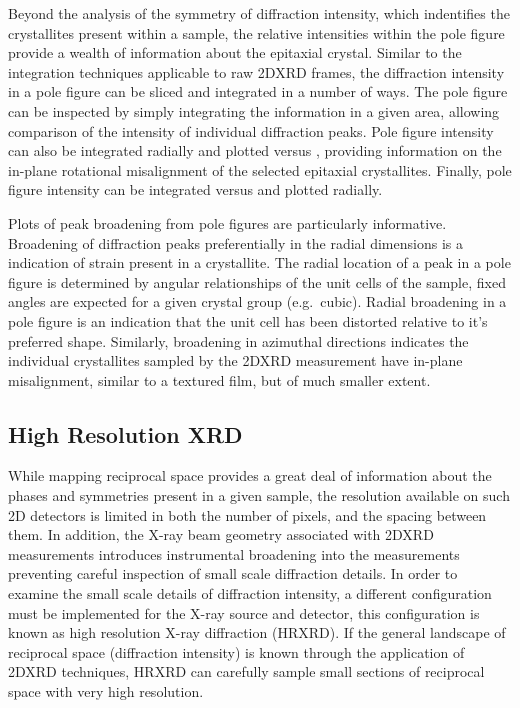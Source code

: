 Beyond the analysis of the symmetry of diffraction intensity, which indentifies the crystallites present within a sample, the relative intensities within the pole figure provide a wealth of information about the epitaxial crystal.
Similar to the integration techniques applicable to raw 2DXRD frames, the diffraction intensity in a pole figure can be sliced and integrated in a number of ways.
The pole figure can be inspected by simply integrating the information in a given area, allowing comparison of the intensity of individual diffraction peaks.
Pole figure intensity can also be integrated radially and plotted versus \textphi{}, providing information on the in-plane rotational misalignment of the selected epitaxial crystallites.
Finally, pole figure intensity can be integrated versus \textphi{} and plotted radially.

Plots of peak broadening from pole figures are particularly informative.
Broadening of diffraction peaks preferentially in the radial dimensions is a indication of strain present in a crystallite.
The radial location of a peak in a pole figure is determined by angular relationships of the unit cells of the sample, fixed angles are expected for a given crystal group (e.g.\ cubic).
Radial broadening in a pole figure is an indication that the unit cell has been distorted relative to it's preferred shape.
Similarly, broadening in azimuthal directions indicates the individual crystallites sampled by the 2DXRD measurement have in-plane misalignment, similar to a textured film, but of much smaller extent.

\subsection{High Resolution XRD} While mapping reciprocal space provides a great deal of information about the phases and symmetries present in a given sample, the resolution available on such 2D detectors is limited in both the number of pixels, and the spacing between them.
In addition, the X-ray beam geometry associated with 2DXRD measurements introduces instrumental broadening into the measurements preventing careful inspection of small scale diffraction details.
In order to examine the small scale details of diffraction intensity, a different configuration must be implemented for the X-ray source and detector, this configuration is known as high resolution X-ray diffraction (HRXRD).
If the general landscape of reciprocal space (diffraction intensity) is known through the application of 2DXRD techniques, HRXRD can carefully sample small sections of reciprocal space with very high resolution.

